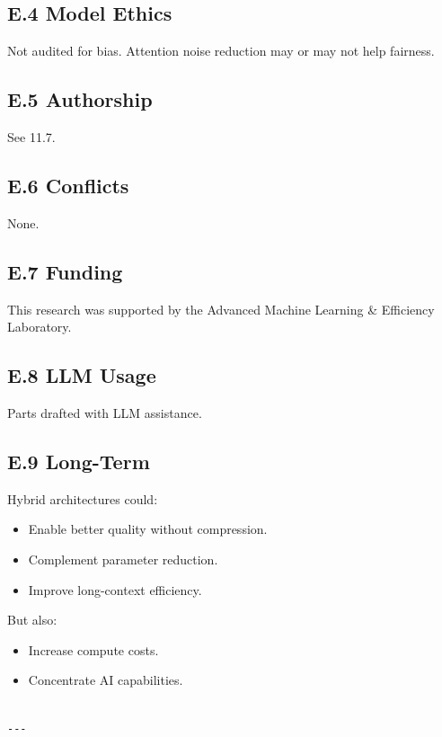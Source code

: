\subsection{E.4 Model Ethics}

Not audited for bias. Attention noise reduction may or may not help fairness.

\subsection{E.5 Authorship}

See  11.7.

\subsection{E.6 Conflicts}

None.

\subsection{E.7 Funding}

This research was supported by the Advanced Machine Learning \& Efficiency Laboratory.

\subsection{E.8 LLM Usage}

Parts drafted with LLM assistance.

\subsection{E.9 Long-Term}

Hybrid architectures could:
\begin{itemize}
\item Enable better quality without compression.
\item Complement parameter reduction.
\item Improve long-context efficiency.

\end{itemize}
But also:
\begin{itemize}
\item Increase compute costs.
\item Concentrate AI capabilities.
\end{itemize}
\begin{lstlisting}

---
\end{lstlisting}